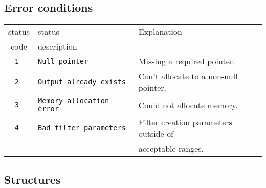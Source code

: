 \subsection{Error conditions}
\begin{tabular}{|c|l|l|}
\hline
status & status      & Explanation \\
 code  & description &             \\
\hline
\tt 1  & \tt Null pointer            & Missing a required pointer.           \\
\tt 2  & \tt Output already exists   & Can't allocate to a non-null pointer. \\
\tt 3  & \tt Memory allocation error & Could not allocate memory.            \\
\tt 4  & \tt Bad filter parameters   & Filter creation parameters outside of \\
       &                             & acceptable ranges.                    \\
\hline
\end{tabular}

\subsection{Structures}
\newpage
\newpage
\newpage
